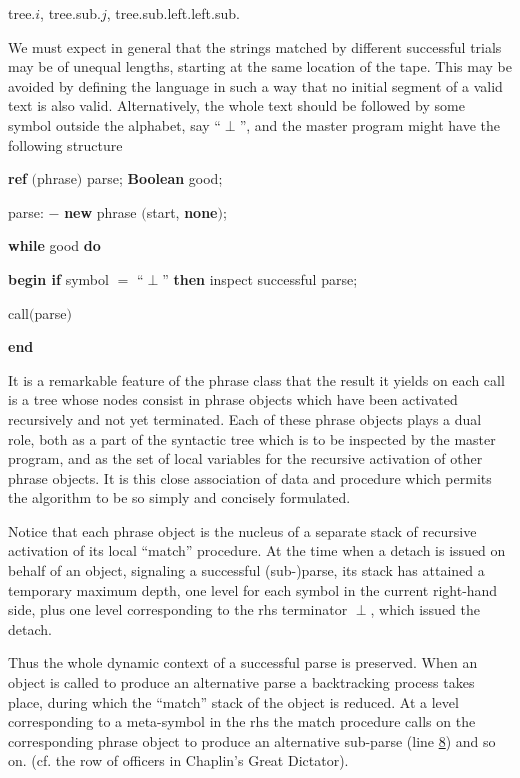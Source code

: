 \quad tree.$i$, tree.sub.$j$, tree.sub.left.left.sub.

We must expect in general that the strings matched by different successful trials may be of unequal lengths, starting at the same location of the tape. This may be avoided by defining the language in such a way that no initial segment of a valid text is also valid. Alternatively, the whole text should be followed by some symbol outside the alphabet, say ``$\perp$'', and the master program might have the following structure

\quad \textbf{ref} $($phrase$)$ parse; \textbf{Boolean} good;

\quad parse: $-$ \textbf{new} phrase $($start, \textbf{none}$)$;

\quad \textbf{while} good \textbf{do}

\quad \textbf{begin if} symbol $=$ ``$\perp$'' \textbf{then} inspect successful parse;

\quad \quad call$($parse$)$

\quad \textbf{end}

It is a remarkable feature of the phrase class that the result it yields on each call is a tree whose nodes consist in phrase objects which have been activated recursively and not yet terminated. Each of these phrase objects plays a dual role, both as a part of the syntactic tree which is to be inspected by the master program, and as the set of local variables for the recursive activation of other phrase objects. It is this close association of data and procedure which permits the algorithm to be so simply and concisely formulated.

Notice that each phrase object is the nucleus of a separate stack of recursive activation of its local ``match'' procedure. At the time when a detach is issued on behalf of an object, signaling a successful (sub-)parse, its stack has attained a temporary maximum depth, one level for each symbol in the current right-hand side, plus one level corresponding to the rhs terminator $\perp$, which issued the detach.

Thus the whole dynamic context of a successful parse is preserved. When an object is called to produce an alternative parse a backtracking process takes place, during which the ``match'' stack of the object is reduced. At a level corresponding to a meta-symbol in the rhs the match procedure calls on the corresponding phrase object to produce an alternative sub-parse (line \hyperref[en:comment-label-8]{8}) and so on. (cf. the row of officers in Chaplin's Great Dictator).

